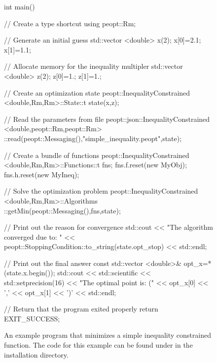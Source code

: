 \begin{figure}
    \ContinuedFloat
    \begin{lstCpp}
int main(){
    // Create a type shortcut
    using peopt::Rm;
    
    // Generate an initial guess 
    std::vector <double> x(2);
    x[0]=2.1; x[1]=1.1;
    
    // Allocate memory for the inequality multipler 
    std::vector <double> z(2);
    z[0]=1.; z[1]=1.;
    
    // Create an optimization state
    peopt::InequalityConstrained <double,Rm,Rm>::State::t
        state(x,z);
    
    // Read the parameters from file
    peopt::json::InequalityConstrained <double,peopt::Rm,peopt::Rm>
        ::read(peopt::Messaging(),"simple_inequality.peopt",state);
    
    // Create a bundle of functions
    peopt::InequalityConstrained <double,Rm,Rm>::Functions::t fns;
    fns.f.reset(new MyObj);
    fns.h.reset(new MyIneq);
    
    // Solve the optimization problem
    peopt::InequalityConstrained <double,Rm,Rm>::Algorithms
        ::getMin(peopt::Messaging(),fns,state);
    
    // Print out the reason for convergence
    std::cout << "The algorithm converged due to: " <<
        peopt::StoppingCondition::to_string(state.opt_stop) <<
        std::endl;
    
    // Print out the final answer
    const std::vector <double>& opt_x=*(state.x.begin());
    std::cout << std::scientific << std::setprecision(16)
        << "The optimal point is: (" << opt_x[0] << ','
        << opt_x[1] << ')' << std::endl;

    // Return that the program exited properly
    return EXIT_SUCCESS;
}
\end{lstCpp}
    \caption{An example program that minimizes a simple inequality constrained function.  The code for this example can be found under \protect{} in the installation directory.}
    \label{fig:simpleIneq}
\end{figure}
